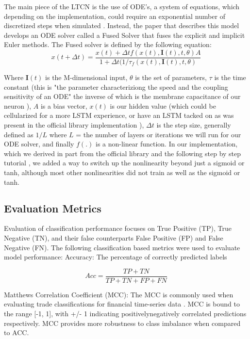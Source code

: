 \documentclass[10pt,twocolumn,letterpaper]{article}
\begin{document}
        The main piece of the LTCN is the use of ODE's, a system of equations, which depending on the implementation, could require an exponential number of discretized steps when simulated \cite{hasani_liquid_2020}. Instead, the paper that describes this model develops an ODE solver called a Fused Solver that fuses the explicit and implicit Euler methods. The Fused solver is defined by the following equation:
\begin{equation}
    x(t + \Delta t) = \frac{x(t) + \Delta t f(x(t), \textbf{I}(t), t, \theta)A}{1 + \Delta t(1/\tau _ f(x(t), \textbf{I}(t), t, \theta)}
\end{equation}

        Where $\textbf{I}(t)$ is the M-dimensional input, $\theta$ is the set of parameters, $\tau$
        is the time constant (this is "the parameter characteriziong the speed and the coupling sensitivity of an ODE" \cite{hasani_liquid_2020} the inverse of which is the membrane capacitance of our neuron \cite{LNN_Tutorial}), $A$ is a bias vector, $x(t)$ is our hidden value (which could be cellularized for a more LSTM experience, or have an LSTM tacked on as was present in the official library implementation \cite{NCP_Github}), $\Delta t$ is the step size, generally defined as $1 / L$ where $L$ = the number of layers or iterations we will run for our ODE solver, and finally $f(.)$ is a non-linear function. In our implementation, which we derived in part from the official library \cite{NCP_Github} and the following step by step tutorial \cite{LNN_Tutorial}, we added a way to switch up the nonlinearity beyond just a sigmoid or tanh, although most other nonlinearities did not train as well as the sigmoid or tanh.

\subsection{Evaluation Metrics}
Evaluation of classification performance focuses on True Positive (TP), True Negative (TN), and their false counterparts False Positive (FP) and False Negative (FN). The following classification based metrics were used to evaluate model performance:
Accuracy: The percentage of correctly predicted labels
 
\begin{equation} \label{eq:accuracy}
    Acc = \frac{TP + TN}{TP + TN + FP + FN}
\end{equation}

Matthews Correlation Coefficient (MCC): The MCC is commonly used when evaluating trade classifications for financial time-series data \cite{STT_Paper,STLAT_sota,zou_survey}. MCC is bound to the range [-1, 1], with +/- 1 indicating positively\/negatively correlated predictions respectively. MCC provides more robustness to class imbalance when compared to ACC.
\end{document}
